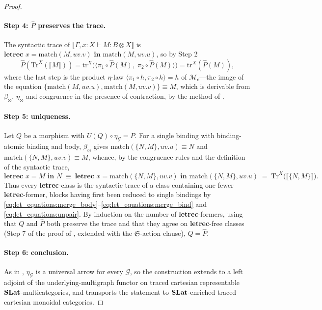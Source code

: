 \begin{proof}
\paragraph{Step 4: $\hat{P}$ preserves the trace.}
The syntactic trace of $\llbracket \Gamma, x : X \vdash M : B \otimes X \rrbracket$ is $\textbf{letrec } x = \text{match}(M, uv.v) \textbf{ in } \text{match}(M, uv.u)$, so by Step 2
\[
\hat{P}(\text{Tr}^{X}(\llbracket M \rrbracket)) = \text{tr}^{X}\bigl( \langle \pi_1 \circ \hat{P}(M),\; \pi_2 \circ \hat{P}(M) \rangle \bigr) = \text{tr}^{X}(\hat{P}(M)),
\]
where the last step is the product $\eta$-law $\langle \pi_1 \circ h, \pi_2 \circ h \rangle = h$ of $\mathcal{M}_c$---the image of the equation $\{\text{match}(M, uv.u), \text{match}(M, uv.v)\} \equiv M$, which is derivable from $\beta_{\otimes}$, $\eta_{\otimes}$ and congruence in the presence of contraction, by the method of .

\paragraph{Step 5: uniqueness.}
Let $Q$ be a morphism with $U(Q) \circ \eta_{\mathcal{G}} = P$.
For a single binding with binding-atomic binding and body, $\beta_{\otimes}$ gives $\text{match}(\{N, M\}, uv.u) \equiv N$ and $\text{match}(\{N, M\}, uv.v) \equiv M$, whence, by the congruence rules and the definition of the syntactic trace,
\[
\textbf{letrec } x = M \textbf{ in } N \;\equiv\; \textbf{letrec } x = \text{match}(\{N, M\}, uv.v) \textbf{ in } \text{match}(\{N, M\}, uv.u) \;=\; \text{Tr}^{X}\bigl( \llbracket \{N, M\} \rrbracket \bigr).
\]
Thus every \textbf{letrec}-class is the syntactic trace of a class containing one fewer \textbf{letrec}-former, blocks having first been reduced to single bindings by \eqref{eq:let_equations:merge_body}--\eqref{eq:let_equations:merge_bind} and \eqref{eq:let_equations:unpair}.
By induction on the number of \textbf{letrec}-formers, using that $Q$ and $\hat{P}$ both preserve the trace and that they agree on \textbf{letrec}-free classes (Step 7 of the proof of , extended with the $\mathfrak{S}$-action clause), $Q = \hat{P}$.

\paragraph{Step 6: conclusion.}
As in , $\eta_{\mathcal{G}}$ is a universal arrow for every $\mathcal{G}$, so the construction extends to a left adjoint of the underlying-multigraph functor on traced cartesian representable $\mathbf{SLat}$-multicategories, and  transports the statement to $\mathbf{SLat}$-enriched traced cartesian monoidal categories.
\end{proof}

